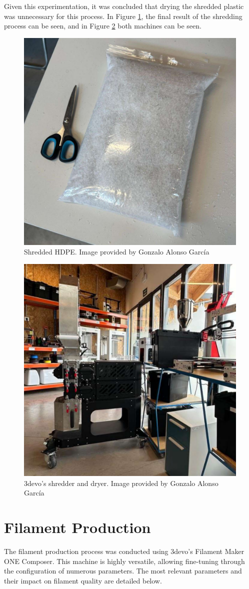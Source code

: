 Given this experimentation, it was concluded that drying the shredded plastic was unnecessary for 
this process. In Figure \ref{fig:shredded_filament}, the final result of the shredding process can 
be seen, and in Figure \ref{fig:shredder_dryer} both machines can be seen.

\begin{figure}[h]
	\centering
	\includegraphics[width = .6\textwidth]{Imagenes/Vectorial/shredded_filament.pdf}
	\caption{Shredded HDPE. Image provided by Gonzalo Alonso García}
	\label{fig:shredded_filament}
\end{figure}

\begin{figure}[h]
	\centering
	\includegraphics[width = .6\textwidth]{Imagenes/Vectorial/shredder_dryer.pdf}
	\caption{3devo's shredder and dryer. Image provided by Gonzalo Alonso García}
	\label{fig:shredder_dryer}
\end{figure}


\section{Filament Production}
The filament production process was conducted using 3devo's Filament Maker ONE Composer. This 
machine is highly versatile, allowing fine-tuning through the configuration of numerous 
parameters. The most relevant parameters and their impact on filament quality are detailed below.

